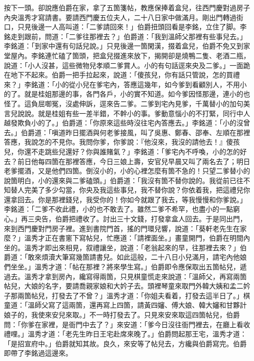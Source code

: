 按下一頭。卻說應伯爵在家，拿了五箇箋帖，教應保捧着盒兒，往西門慶對過房子內央溫秀才寫請書。要請西門慶五位夫人，二十八日家中做滿月。剛出門轉過街口，只見後邊一人高叫道：「二爹請回來！」伯爵扭頭回看是李銘，立住了脚。李銘走到跟前，問道：「二爹往那裡去？」伯爵道：「我到溫師父那裡有些事兒去。」李銘道：「到家中還有句話兒說。」只見後邊一箇閑漢，掇着盒兒，伯爵不免又到家堂屋內。李銘連忙磕了箇頭，把盒兒掇進來放下，揭開卻是燒鴨二隻、老酒二瓶，說道：「小人沒甚，這些微物兒孝順二爹賞人。小的有句話逕來央及二爹。」一面跪在地下不起來。伯爵一把手拉起來，說道：「傻孩兒，你有話只管說，怎的買禮來？」李銘道：「小的從小兒在爹宅內，答應這幾年，如今爹到看顧別人，不用小的了。就是桂姐那邊的事，各門各戶，小的實不知道。如今爹因怪那邊，連小的也怪了。這負屈啣冤，沒處伸訴，逕來告二爹。二爹到宅內見爹，千萬替小的加句美言兒說說。就是桂姐有些一差半錯，不幹小的事。爹動意惱小的不打緊，同行中人越發欺負小的了。」伯爵道：「你原來這些時沒往宅內答應去。」李銘道：「小的沒曾去。」伯爵道：「嗔道昨日擺酒與何老爹接風，叫了吳惠、鄭春、邵奉、左順在那裡答應，我說怎的不見你。我問你爹，你爹說：『他沒來，我沒的請他去！』傻孩兒，你還不走跳些兒還好？你與誰賭氣？」李銘道：「爹宅內不呼喚，小的怎的好去？前日他每四箇在那裡答應，今日三娘上壽，安官兒早晨又叫了兩名去了；明日老爹擺酒，又是他們四箇。倒沒小的，小的心裡怎麼有箇不急的！只望二爹替小的說箇明白，小的還來與二爹磕頭。」伯爵道：「我沒有箇不替你說的。我從前已往不知替人完美了多少勾當，你央及我這些事兒，我不替你說？你依着我，把這禮兒你還拿回去。你是那裡錢兒，我受你的！你如今就跟了我去，等我慢慢和你爹說。」李銘道：「二爹不收此禮，小的也不敢去了。雖然二爹不希罕，也盡小的一點窮心。」再三央告，伯爵把禮收了。討出三十文錢，打發拿盒人回去。于是同出門，來到西門慶對門房子裡。進到書院門首，搖的門環兒響，說道：「葵軒老先生在家麼？」溫秀才正在書窻下寫帖兒，忙應道：「請裡面坐。」畫童開門，伯爵在明間內坐的。溫秀才即出來相見，叙禮讓坐，說道：「老翁起來的早，往那裡去來？」伯爵道：「敢來煩瀆大筆寫幾箇請書兒。如此這般，二十八日小兒滿月，請宅內他娘們坐坐。」溫秀才道：「帖在那裡？將來學生寫。」伯爵即令應保取出五箇帖兒，遞過去。溫秀才拿到房內，纔寫得兩箇，只見棋童慌走來說道：「溫師父，再寫兩箇帖兒，大娘的名字，要請喬親家娘和大妗子去。頭裡琴童來取門外韓大姨和孟二妗子那兩箇帖兒，打發去了不曾？」溫秀才道：「你姐夫看着，打發去這半日了。」棋童道：「溫師父寫了這兩箇，還再寫上四箇，請黃四嬸、傅大娘、韓大嬸和甘夥計娘子的，我使來安兒來取。」不一時打發去了。只見來安來取這四箇帖兒，伯爵問：「你爹在家裡，是衙門中去了？」來安道：「爹今日沒往衙門裡去，在廳上看收禮哩。」溫秀才道：「老先生昨日王宅赴席來晚了。」伯爵問起那王宅，溫秀才道：「是招宣府中。」伯爵就知其故。良久，來安等了帖兒去，方纔與伯爵寫完。伯爵即帶了李銘過這邊來。

